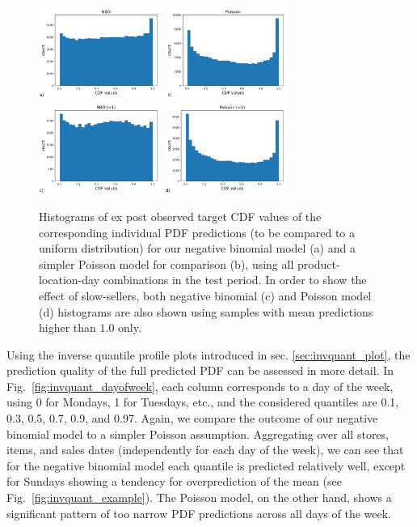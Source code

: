 \documentclass[BCOR=1mm, DIV=calc,10pt,
twoside=true,
twocolumn,
headings=normal]{scrartcl}
\newcommand{\fig}{Fig.~}
\begin{document}
\begin{figure}
\begin{center}
\includegraphics[width=4cm]{figs/cdf_truth_nbinom}
\includegraphics[width=4cm]{figs/cdf_truth_poisson}
\includegraphics[width=4cm]{figs/cdf_truth_nbinom_larger1}
\includegraphics[width=4cm]{figs/cdf_truth_poisson_larger1}
\caption{\label{fig:cdf_demand} Histograms of ex post observed target CDF values of the corresponding individual PDF predictions (to be compared to a uniform distribution) for our negative binomial model (a) and a simpler Poisson model for comparison (b), using all product-location-day combinations in the test period. In order to show the effect of slow-sellers, both negative binomial (c) and Poisson model (d) histograms are also shown using samples with mean predictions higher than $1.0$ only.}
\end{center}
\end{figure}

Using the inverse quantile profile plots introduced in sec. \ref{sec:invquant_plot}, the prediction quality of the full predicted PDF can be assessed in more detail. In \fig \ref{fig:invquant_dayofweek}, each column corresponds to a day of the week, using 0 for Mondays, 1 for Tuesdays, etc., and the considered quantiles are 0.1, 0.3, 0.5, 0.7, 0.9, and 0.97. Again, we compare the outcome of our negative binomial model to a simpler Poisson assumption. Aggregating over all stores, items, and sales dates (independently for each day of the week), we can see that for the negative binomial model each quantile is predicted relatively well, except for Sundays showing a tendency for overprediction of the mean (see \fig \ref{fig:invquant_example}). The Poisson model, on the other hand, shows a significant pattern of too narrow PDF predictions across all days of the week.
\end{document}
